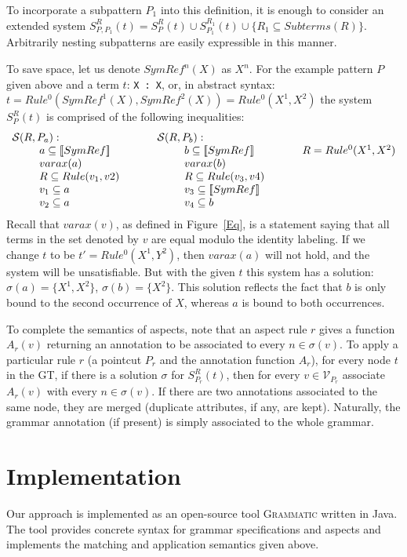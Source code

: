 \documentclass{IOS-Book-Article}     %
\newcommand{\sem}[1]{[\![#1]\!]}
\newcommand{\Eq}{\mathcal{S}}
\newcommand{\figref}[1]{Figure~\ref{#1}}
\newcommand{\tool}[1]{\textsc{#1}}
\newcommand{\Grammatic}[0]{\tool{Grammatic}}
\begin{document}
To incorporate a subpattern $P_1$ into this definition, it is enough to consider an extended system $S^R_{P, P_1}(t) = S^R_P(t) \cup S^{R_1}_{P_1}(t) \cup \{R_1 \subseteq Subterms(R)\}$. Arbitrarily nesting subpatterns are easily expressible in this manner.

To save space, let us denote $SymRef^{n}(X)$ as $X^n$. For the example pattern $P$ given above and a term $t$: \lstinline!X : X!, or, in abstract syntax: \mbox{$t = Rule^0(SymRef^1(X), SymRef^2(X)) = Rule^0(X^1, X^2)$} the system $S^R_P(t)$ is comprised of the following inequalities: 
$$
\begin{array}{llllllll|}
\multicolumn{2}{l}{\Eq{}(R, P_a):} && \multicolumn{2}{l}{\Eq{}(R, P_b):} &&\indent\\
\indent&a \subseteq \sem{SymRef}    &\indent&\indent& b \subseteq \sem{SymRef} &\indent& R = Rule^0(X^1, X^2)\\
&varax(a)&&&varax(b)&&\\
&R \subseteq Rule(v_1, v2)   &&& R \subseteq Rule(v_3, v4) &&\\
&v_1 \subseteq a               &&& v_3 \subseteq \sem{SymRef} &&\\
&v_2 \subseteq a               &&& v_4 \subseteq b &&\\
\end{array}
$$
Recall that $varax(v)$, as defined in \figref{Eq}, is a statement saying that all terms in the set denoted by $v$ are equal modulo the identity labeling. If we change $t$ to be $t' = Rule^0(X^1, Y^2)$, then $varax(a)$ will not hold, and the system will be unsatisfiable. But with the given $t$ this system has a solution: $\sigma(a) = \{X^1, X^2\}$, $\sigma(b) = \{X^2\}$. This solution reflects the fact that $b$ is only bound to the second occurrence of $X$, whereas $a$ is bound to both occurrences.

To complete the semantics of aspects, note that an aspect rule $r$ gives a function $A_r(v)$ returning an annotation to be associated to every $n \in \sigma(v)$. To apply a particular rule $r$ (a pointcut $P_r$ and the annotation function $A_r$), for every node $t$ in the GT, if there is a solution $\sigma$ for $S^R_{P_r}(t)$, then for every $v \in \mathcal{V}_{P_r}$ associate $A_r(v)$ with every $n \in \sigma(v)$. If there are two annotations associated to the same node, they are merged (duplicate attributes, if any, are kept). Naturally, the grammar annotation (if present) is simply associated to the whole grammar.

\section{Implementation}
Our approach is implemented as an open-source tool \Grammatic{}%
 written in Java. The tool provides concrete syntax for grammar specifications and aspects and implements the matching and application semantics given above. 
\end{document}
